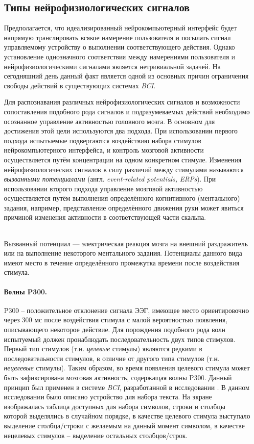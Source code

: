 \documentclass[12pt,a4paper,oneside,fleqn,leqno]{article}
\newcounter{pe} %
\newcommand*{\Nep}{\addtocounter{pe}{1}{\arabic{pe}$^{\circ}$.\;}}
\newcommand*{\NepS}{\mbox{} \\ \Nep}
\begin{document}
	\subsection{Типы нейрофизиологических сигналов}
	\par Предполагается, что идеализированный нейрокомпьютерный интерфейс будет напрямую транслировать всякое намерение пользователя и посылать сигнал управляемому устройству о выполнении соответствующего действия. Однако установление однозначного соответствия между намерениями пользователя и нейрофизиологическими сигналами является нетривиальной задачей. На сегодняшний день данный факт является одной из основных причин ограничения свободы действий в существующих системах {\it BCI}.
	\par Для распознавания различных нейрофизиологических сигналов и возможности сопоставления подобного рода сигналов и подразумеваемых действий необходимо осознанное управление активностью головного мозга. В основном для достижения этой цели используются два подхода. При использовании первого подхода испытыемые подвергаются воздействию набора стимулов нейрокомпьютерного интерфейса, и контроль мозговой активности осуществляется путём концентрации на одном конкретном стимуле. Изменения нейрофизиологических сигналов в силу различий между стимулами называются {\it вызванными потенциалами} (англ. {\it event-related potentials, ERPs}). При использовании второго подхода управление мозговой активностью осуществляется путём выполнения определённого когнитивного (ментального) задания, например, представление определённого движения руки может явиться причиной изменения активности в соответствующей части скальпа.\\
	\setcounter{pe}{0}
	\NepS {\bf Вызванные потенциалы}
	\par Вызванный потенциал — электрическая реакция мозга на внешний раздражитель или на выполнение некоторого ментального задания. Потенциалы данного вида имеют место в течение определённого промежутка времени после воздействия стимула.
	\paragraph{Волны P300.}
	 P300 -- положительное отклонение сигнала ЭЭГ, имеющее место ориентировочно через 300 мс после воздействия стимула с малой вероятностью появления, описывающего некоторое действие. Для порождения подобного рода волн испытуемый должен пронаблюдать последовательность двух типов стимулов. Первый тип стимулов (т.н. {\it целевые} стимулы) являются редкими в последовательности стимулов, в отличие от другого типа стимулов (т.н. {\it нецелевые} стимулы). Таким образом, во время появления целевого стимула может быть зафиксирована мозговая активность, содержащая волны P300. Данный принцип был применен в системе {\it BCI}, разработанной в исследовании \cite{Farwell_Donchin}. В данном исследовании было описано устройство для набора текста. На экране изображалась таблица доступных для набора символов, строки и столбцы которой выделялись в случайном порядке, в качестве целевого стимула выступало выделение столбца/строки с желаемым на данный момент символом, в качестве нецелевых стимулов -- выделение остальных столбцов/строк.
\end{document}

